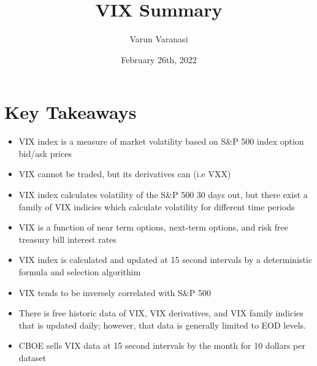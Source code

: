 \documentclass{article}
\title{VIX Summary}
\author{Varun Varanasi}
\date{February 26th, 2022}
\begin{document}
\maketitle


\section*{Key Takeaways}
\begin{itemize}
    \item VIX index is a measure of market volatility based on S\&P 500 index option bid/ask prices
    \item VIX cannot be traded, but its derivatives can (i.e VXX)
    \item VIX index calculates volatility of the S\&P 500 30 days out, but there exist a family of VIX indicies which calculate volatility for different time periods
    \item VIX is a function of near term options, next-term options, and risk free treasury bill interest rates
    \item VIX index is calculated and updated at 15 second intervals by a deterministic formula and selection algorithim
    \item VIX tends to be inversely correlated with S\&P 500
    \item There is free historic data of VIX, VIX derivatives, and VIX family indicies that is updated daily; however, that data is generally limited to EOD levels.
    \item CBOE sells VIX data at 15 second intervals by the month for 10 dollars per dataset 
\end{itemize}
\end{document}
